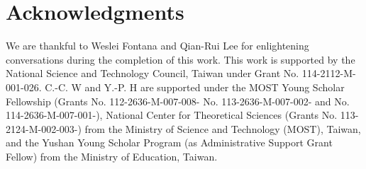 \section*{Acknowledgments}
We are thankful to Weslei Fontana and Qian-Rui Lee for enlightening conversations during the completion of this work. 
This work is supported by the National Science and Technology Council, Taiwan under Grant No. 114-2112-M-001-026.
C.-C. W and Y.-P. H are supported under the MOST Young Scholar Fellowship (Grants No. 112-2636-M-007-008- No. 113-2636-M-007-002- and No. 114-2636-M-007-001-), National Center for Theoretical Sciences (Grants No. 113-2124-M-002-003-) from the Ministry of Science and Technology (MOST), Taiwan, and the Yushan Young Scholar Program (as Administrative Support Grant Fellow) from the Ministry of Education, Taiwan.

